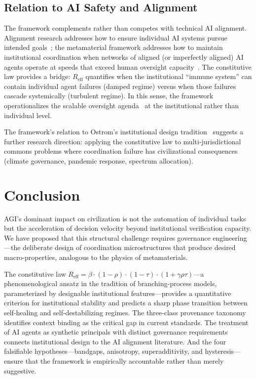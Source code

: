 \documentclass[runningheads]{llncs}
\begin{document}
\subsection{Relation to AI Safety and Alignment}

The framework complements rather than competes with technical AI alignment. Alignment research addresses how to ensure individual AI systems pursue intended goals~\cite{amodei2016concrete,gabriel2020artificial}; the metamaterial framework addresses how to maintain institutional coordination when networks of aligned (or imperfectly aligned) AI agents operate at speeds that exceed human oversight capacity~\cite{hendrycks2022xrisk}. The constitutive law provides a bridge: $R_{\mathrm{eff}}$ quantifies when the institutional ``immune system'' can contain individual agent failures (damped regime) versus when those failures cascade systemically (turbulent regime). In this sense, the framework operationalizes the scalable oversight agenda~\cite{bowman2022measuring} at the institutional rather than individual level.

The framework's relation to Ostrom's institutional design tradition~\cite{ostrom1990governing} suggests a further research direction: applying the constitutive law to multi-jurisdictional commons problems where coordination failure has civilizational consequences (climate governance, pandemic response, spectrum allocation).


\section{Conclusion}
\label{sec:conclusion}

AGI's dominant impact on civilization is not the automation of individual tasks but the acceleration of decision velocity beyond institutional verification capacity. We have proposed that this structural challenge requires governance engineering---the deliberate design of coordination microstructures that produce desired macro-properties, analogous to the physics of metamaterials.

The constitutive law $R_{\mathrm{eff}} = \beta \cdot (1-\rho) \cdot (1-\tau) \cdot (1+\gamma \rho \tau)$---a phenomenological ansatz in the tradition of branching-process models, parameterized by designable institutional features---provides a quantitative criterion for institutional stability and predicts a sharp phase transition between self-healing and self-destabilizing regimes. The three-class provenance taxonomy identifies context binding as the critical gap in current standards. The treatment of AI agents as synthetic principals with distinct governance requirements connects institutional design to the AI alignment literature. And the four falsifiable hypotheses---bandgaps, anisotropy, superadditivity, and hysteresis---ensure that the framework is empirically accountable rather than merely suggestive.
\end{document}
